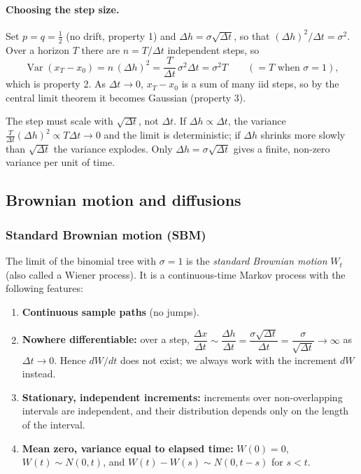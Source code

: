 \paragraph{Choosing the step size.} Set $p=q=\tfrac12$ (no drift, property 1) and $\Delta h=\sigma\sqrt{\Delta t}$, so that $(\Delta h)^2/\Delta t=\sigma^2$. Over a horizon $T$ there are $n=T/\Delta t$ independent steps, so
\[
\operatorname{Var}(x_T-x_0)=n\,(\Delta h)^2=\frac{T}{\Delta t}\,\sigma^2\Delta t=\sigma^2T\qquad(=T\text{ when }\sigma=1),
\]
which is property 2. As $\Delta t\to0$, $x_T-x_0$ is a sum of many iid steps, so by the central limit theorem it becomes Gaussian (property 3).

\begin{tipbox}
The step must scale with $\sqrt{\Delta t}$, not $\Delta t$. If $\Delta h\propto\Delta t$, the variance $\frac{T}{\Delta t}(\Delta h)^2\propto T\Delta t\to0$ and the limit is deterministic; if $\Delta h$ shrinks more slowly than $\sqrt{\Delta t}$ the variance explodes. Only $\Delta h=\sigma\sqrt{\Delta t}$ gives a finite, non-zero variance per unit of time.
\end{tipbox}

\subsection{Brownian motion and diffusions }

\subsubsection{Standard Brownian motion (SBM)}\label{sec:sbm}
The limit of the binomial tree with $\sigma=1$ is the \emph{standard Brownian motion} $W_t$ (also called a Wiener process). It is a continuous-time Markov process with the following features:
\begin{enumerate}
\item \textbf{Continuous sample paths} (no jumps).
\item \textbf{Nowhere differentiable:} over a step, $\dfrac{\Delta x}{\Delta t}\sim\dfrac{\Delta h}{\Delta t}=\dfrac{\sigma\sqrt{\Delta t}}{\Delta t}=\dfrac{\sigma}{\sqrt{\Delta t}}\to\infty$ as $\Delta t\to0$. Hence $dW/dt$ does not exist; we always work with the increment $dW$ instead.
\item \textbf{Stationary, independent increments:} increments over non-overlapping intervals are independent, and their distribution depends only on the length of the interval.
\item \textbf{Mean zero, variance equal to elapsed time:} $W(0)=0$, $W(t)\sim N(0,t)$, and $W(t)-W(s)\sim N(0,t-s)$ for $s<t$.
\end{enumerate}

